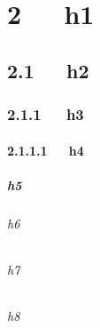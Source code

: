 \documentclass[letterpaper,12pt,english]{sphinxmanual}
\begin{document}
\begin{sphinxShadowBox}
\begin{itemize}
\begin{itemize}
\begin{itemize}
\begin{itemize}
\begin{itemize}
\begin{itemize}
\begin{itemize}
\begin{itemize}
\end{itemize}

\end{itemize}

\end{itemize}

\end{itemize}

\end{itemize}

\end{itemize}

\end{itemize}

\end{itemize}
\end{sphinxShadowBox}


\chapter{2   h1}
\label{\detokenize{001software/001install/gramma:h1}}

\section{2.1   h2}
\label{\detokenize{001software/001install/gramma:h2}}

\subsection{2.1.1   h3}
\label{\detokenize{001software/001install/gramma:h3}}

\subsubsection{2.1.1.1   h4}
\label{\detokenize{001software/001install/gramma:h4}}

\paragraph{h5}
\label{\detokenize{001software/001install/gramma:h5}}

\subparagraph{h6}
\label{\detokenize{001software/001install/gramma:h6}}

\subparagraph{h7}
\label{\detokenize{001software/001install/gramma:h7}}

\subparagraph{h8}
\label{\detokenize{001software/001install/gramma:h8}}
\end{document}
